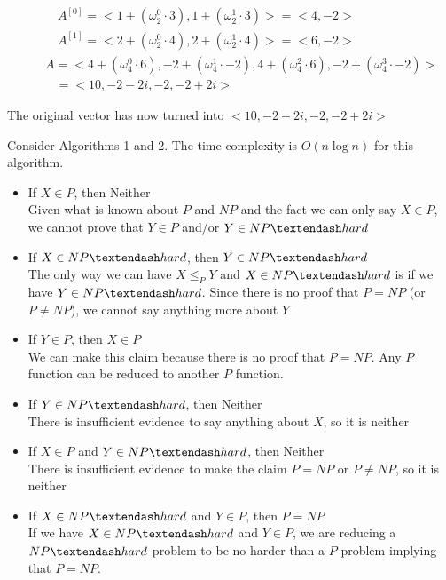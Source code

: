 \documentclass[11pt]{article}
\begin{document}
\begin{equation}
\begin{split}
& \quad \quad A^{[0]} = <1 + (\omega_2^0\cdot 3), 1 + (\omega_2^1\cdot 3)> = <4,-2>\\
& \quad \quad A^{[1]} = <2 + (\omega_2^0\cdot 4), 2 + (\omega_2^1\cdot 4)> = <6,-2>\\
& \quad A = <4 + (\omega_4^0\cdot 6), -2 + (\omega_4^1\cdot -2), 4 + (\omega_4^2\cdot 6), -2 + (\omega_4^3\cdot -2)>\\
& \quad \;\;\; = <10, -2 - 2i, -2, -2 + 2i>
\end{split}
\end{equation}

The original vector has now turned into $<10, -2 - 2i, -2, -2 + 2i>$

\bigskip


Consider Algorithms 1 and 2. The time complexity is $O(n\log n)$ for this algorithm.


\bigskip


\begin{itemize}
\item If $X \in P$, then Neither\\
Given what is known about $P$ and $NP$ and the fact we can only say $X \in P$, we cannot prove that $Y \in P$ and/or $Y \in NP\textendash hard$
\item If $X \in NP\textendash hard$, then $Y \in NP\textendash hard$\\
The only way we can have $X \leq_P Y$ and $X \in NP\textendash hard$ is if we have $Y \in NP\textendash hard$. Since there is no proof that $P = NP$ (or $P \neq NP$), we cannot say anything more about $Y$
\item If $Y \in P$, then $X \in P$\\
We can make this claim because there is no proof that $P = NP$. Any $P$ function can be reduced to another $P$ function.
\item If $Y \in NP\textendash hard$, then Neither\\
There is insufficient evidence to say anything about $X$, so it is neither
\item If $X \in P$ and $Y \in NP\textendash hard$, then Neither\\
There is insufficient evidence to make the claim $P = NP$ or $P \neq NP$, so it is neither
\item If $X \in NP\textendash hard$ and $Y \in P$, then $P = NP$\\
If we have $X \in NP\textendash hard$ and $Y \in P$, we are reducing a $NP\textendash hard$ problem to be no harder than a $P$ problem implying that $P = NP$.
\end{itemize}
\end{document}
